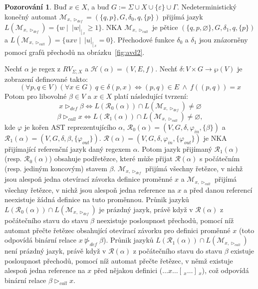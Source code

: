 \documentclass[thesis=B,czech]{FITthesis}[2019/12/23]
\theoremstyle{definition}
\newtheorem{pozorovani}{Pozorování}[chapter]
\begin{document}
\begin{pozorovani}\label{obs:avd} Buď $x \in X$, a buď $G:=\Sigma\cup X\cup\{\varepsilon\}\cup\Gamma$. Nedeterministický konečný automat $\mathcal{M}_{x, \triangleright_{def}} = (\{q, p\}, G, \delta_0, q, \{p\})$ přijímá jazyk $L(\mathcal{M}_{x, \triangleright_{def}})={\{w \mid \ |w|_{[\,_x}\ge1\}}$. NKA $\mathcal{M}_{x, \triangleright_{call}}$ je pětice $(\{q, p, \varnothing\}, G, \delta_1, q, \{p\})$ a $L(\mathcal{M}_{x, \triangleright_{call}})= \{uxv \mid \ |u|_{[\,_x}=0\}$. Přechodové funkce $\delta_0$ a $\delta_1$ jsou znázorněny pomocí grafů přechodů na obrázku~\ref{fig:avd2}. 

Nechť $\alpha$ je regex z $RV_{\Sigma, X}$ a $\mathcal{H}(\alpha)=(V,E,f)$. Nechť $\delta : V \times G \rightarrow \wp(V)$ je zobrazení definované takto:
\begin{equation*}(\forall p, q \in V) (\forall x \in G) \ q \in \delta(p, x) \iff (p, q) \in E \ \wedge \ f((p,q))=x
\end{equation*}
Potom pro libovolné $\beta \in V$ a $x\in X$ platí následující tvrzení:
\begin{equation*} x \triangleright_{def} \beta \iff L(\mathcal{R}_0(\alpha))\cap L(\mathcal{M}_{x, \triangleright_{def}}) \ne \varnothing \end{equation*} \begin{equation*} \beta \triangleright_{call} x \iff L(\mathcal{R}_1(\alpha))\cap L(\mathcal{M}_{x, \triangleright_{call}}) \ne \varnothing, \end{equation*}
kde $\varphi$ je kořen AST reprezentujícího $\alpha$, $\mathcal{R}_0(\alpha)=(V, G, \delta, \varphi_{in}, \{\beta\})$ a $\mathcal{R}_1(\alpha)=(V, G, \delta, \beta, \{\varphi_{out}\})$.
$\mathcal{R}(\alpha) = (V, G, \delta, \varphi_{in}, \{\varphi_{out}\})$ je NKA přijímající referenční jazyk daný regexem $\alpha$. Potom jazyk přijímaný $\mathcal{R}_1(\alpha)$ (resp. $\mathcal{R}_0(\alpha)$) obsahuje podřetězce, které může přijat $\mathcal{R}(\alpha)$ s počátečním (resp. jediným koncovým) stavem $\beta$. $\mathcal{M}_{x, \triangleright_{def}}$ přijímá všechny řetězce, v nichž jsou alespoň jedna otevírací závorka definice proměnné $x$ a $\mathcal{M}_{x, \triangleright_{call}}$ přijímá všechny řetězce, v nichž jsou alespoň jedna reference na $x$ a před danou referencí neexistuje žádná definice na tuto proměnnou. Průnik jazyků $L(\mathcal{R}_0(\alpha))\cap L(\mathcal{M}_{x, \triangleright_{def}})$ je prázdný jazyk, právě když v $\mathcal{R}(\alpha)$ z počátečního stavu do stavu $\beta$ neexistuje posloupnost přechodů, pomocí níž automat přečte řetězec obsahující otevírací závorku pro definici proměnné $x$ (toto odpovídá binární relace $x \ntriangleright_{def} \beta$). Průnik jazyků $L(\mathcal{R}_1(\alpha))\cap L(\mathcal{M}_{x, \triangleright_{call}})$ není prázdný jazyk, právě když v $\mathcal{R}(\alpha)$ z počátečního stavu do stavu $\beta$ existuje posloupnost přechodů, pomocí níž automat přečte řetězec, v němž existuje alespoň jedna reference na $x$ před nějakou definici ($\dots x \dots [\,_x \dots ]\,_x$), což odpovídá binární relace $\beta \triangleright_{call} x$.
\end{pozorovani}
\end{document}
